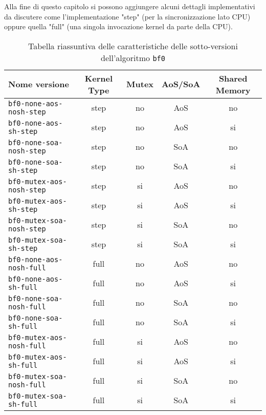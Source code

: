 \documentclass{article}
\begin{document}
	Alla fine di questo capitolo si possono aggiungere alcuni dettagli implementativi da discutere come l'implementazione "step" (per la sincronizzazione lato CPU) oppure quella "full" (una singola invocazione kernel da parte della CPU).
	
	\begin{table}[!ht]
		\centering
		\begin{tabular}{|l|c|c|c|c|}
			\hline
			\textbf{Nome versione} & \textbf{Kernel Type} & \textbf{Mutex} & \textbf{AoS/SoA} & \textbf{Shared Memory} \\ \hline
			\texttt{bf0-none-aos-nosh-step}  & step & no & AoS & no \\ \hline
			\texttt{bf0-none-aos-sh-step}    & step & no & AoS & si \\ \hline
			\texttt{bf0-none-soa-nosh-step}  & step & no & SoA & no \\ \hline
			\texttt{bf0-none-soa-sh-step}    & step & no & SoA & si \\ \hline
			\texttt{bf0-mutex-aos-nosh-step} & step & si & AoS & no \\ \hline
			\texttt{bf0-mutex-aos-sh-step}   & step & si & AoS & si \\ \hline
			\texttt{bf0-mutex-soa-nosh-step} & step & si & SoA & no \\ \hline
			\texttt{bf0-mutex-soa-sh-step}   & step & si & SoA & si \\ \hline
			\texttt{bf0-none-aos-nosh-full}  & full & no & AoS & no \\ \hline
			\texttt{bf0-none-aos-sh-full}    & full & no & AoS & si \\ \hline
			\texttt{bf0-none-soa-nosh-full}  & full & no & SoA & no \\ \hline
			\texttt{bf0-none-soa-sh-full}    & full & no & SoA & si \\ \hline
			\texttt{bf0-mutex-aos-nosh-full} & full & si & AoS & no \\ \hline
			\texttt{bf0-mutex-aos-sh-full}   & full & si & AoS & si \\ \hline
			\texttt{bf0-mutex-soa-nosh-full} & full & si & SoA & no \\ \hline
			\texttt{bf0-mutex-soa-sh-full}   & full & si & SoA & si \\ \hline
		\end{tabular}
		\label{tab:riassunto_bf0}
		\caption{Tabella riassuntiva delle caratteristiche delle sotto-versioni dell'algoritmo \texttt{bf0}}
	\end{table}
	
\end{document}
